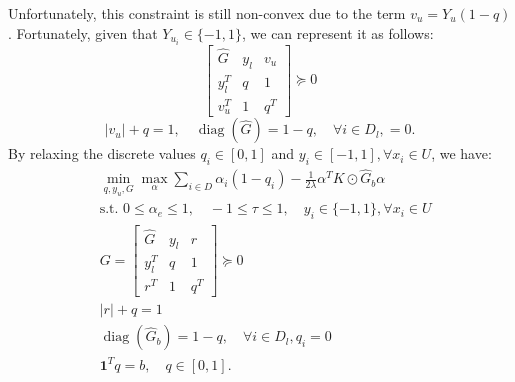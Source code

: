 \documentclass[12pt]{article}
\DeclareMathOperator{\diag}{diag}
\begin{document}
	Unfortunately, this constraint is still non-convex due to the term $v_u = Y_u(1-q)$. Fortunately, given that $Y_{u_i} \in \{-1, 1\}$, we can represent it as follows:
	\begin{equation}
		\begin{bmatrix}
			\hat{G} & y_l & v_u \\
			y_l^T & q & 1 \\
			v_u^T & 1 & q^T
		\end{bmatrix} \succeq 0
	\end{equation}
	\begin{equation}
		|v_u| + q = 1, \quad \diag(\hat{G}) = 1 - q, \quad \forall i \in D_l, = 0.
	\end{equation}
	By relaxing the discrete values $q_i \in [0, 1]$ and $y_i \in [-1, 1], \forall x_i \in U$, we have:
	\begin{subequations}
		\label{eq:ral-relaxed}
		\begin{align}
			&\min_{q, y_u, G} \max_{\alpha} \sum_{i \in D} \alpha_i (1 - q_i) - \frac{1}{2\lambda} \alpha^T K \odot \hat{G}_b \alpha \\
			&\text{s.t. } 0 \le \alpha_e \le 1, \quad -1 \le \tau \le 1, \quad y_i \in \{-1, 1\}, \forall x_i \in U \\
			&G = \begin{bmatrix}
				\hat{G} & y_l & r \\
				y_l^T & q & 1 \\
				r^T & 1 & q^T
			\end{bmatrix} \succeq 0 \\
			&|r| + q = 1 \\
			&\diag(\hat{G}_b) = 1 - q, \quad \forall i \in D_l, q_i = 0 \\
			&\mathbf{1}^T q = b, \quad q \in [0, 1].
		\end{align}
	\end{subequations}
	
\end{document}
